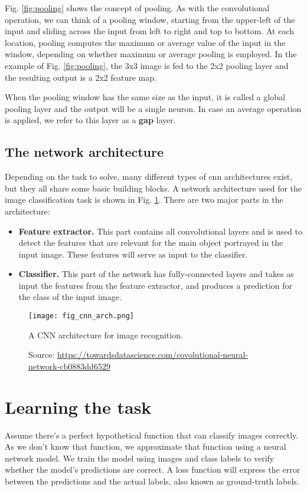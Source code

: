 Fig. \ref{fig:pooling} shows the concept of pooling. As with the convolutional operation, we can think of a pooling window, starting from the upper-left of the input and sliding across the input from left to right and top to bottom. At each location, pooling computes the maximum or average value of the input in the window, depending on whether maximum or average pooling is employed. In the example of Fig. \ref{fig:pooling}, the 3x3 image is fed to the 2x2 pooling layer and the resulting output is a 2x2 feature map.

When the pooling window has the same size as the input, it is called a global pooling layer and the output will be a single neuron. In case an average operation is applied, we refer to this layer as a \textbf{\acrfull{gap}} layer.


\subsection{The network architecture}
Depending on the task to solve, many different types of \acrshort{cnn} architectures exist, but they all share some basic building blocks. A network architecture used for the image classification task is shown in Fig. \ref{fig:cnn_arch}. There are two major parts in the architecture:
\begin{itemize}
\item \textbf{Feature extractor.} This part contains all convolutional layers and is used to detect the features that are relevant for the main object portrayed in the input image. These features will serve as input to the classifier.
\item \textbf{Classifier.} This part of the network has fully-connected layers and takes as input the features from the feature extractor, and produces a   prediction for the class of the input image.
\end{itemize}
\begin{figure}[ht]
    \begin{center}       
    \texttt{[image: fig\_cnn\_arch.png]}
    \caption[A CNN architecture for image recognition]{A CNN architecture for image recognition.}
    \caption*{Source: \href{https://towardsdatascience.com/covolutional-neural-network-cb0883dd6529}{https://towardsdatascience.com/covolutional-neural-network-cb0883dd6529}}
    \label{fig:cnn_arch}
    \end{center}
\end{figure}

\section{Learning the task}
Assume there's a perfect hypothetical function that can classify images correctly. As we don't know that function, we approximate that function using a neural network model. We train the model using images and class labels to verify whether the model's predictions are correct. A loss function will express the error between the predictions and the actual labels, also known as ground-truth labels.


